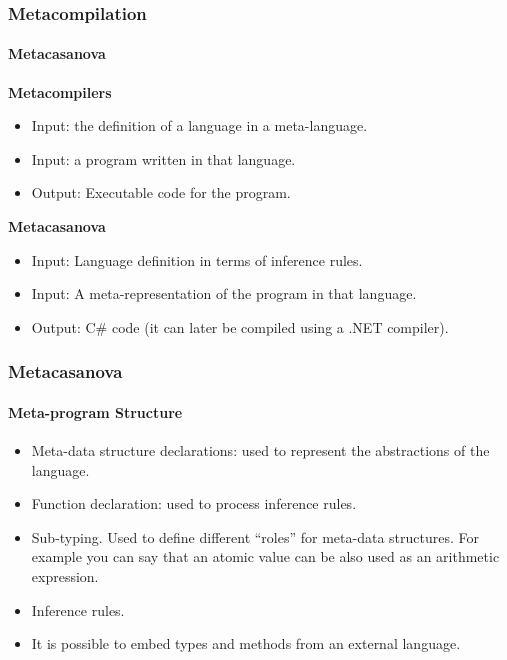 \documentclass[10pt,a4paper]{beamer}
\begin{document}
\begin{frame}
\frametitle{Metacompilation}
\framesubtitle{Metacasanova}

\textbf{Metacompilers}
\begin{itemize}
	\item Input: the definition of a language in a meta-language.
	\item Input: a program written in that language.
	\item Output: Executable code for the program.
\end{itemize}

\textbf{Metacasanova}
\begin{itemize}
	\item Input: Language definition in terms of inference rules.
	\item Input: A meta-representation of the program in that language.
	\item Output: C\# code (it can later be compiled using a .NET compiler).
\end{itemize}
\end{frame}

\begin{frame}
\frametitle{Metacasanova}
\framesubtitle{Meta-program Structure}

\begin{itemize}
	\item Meta-data structure declarations: used to represent the abstractions of the language.
	\item Function declaration: used to process inference rules.
	\item Sub-typing. Used to define different ``roles'' for meta-data structures. For example you can say that an atomic value can be also used as an arithmetic expression.
	\item Inference rules.
	\item It is possible to embed types and methods from an external language.
\end{itemize}
\end{frame}
\end{document}
